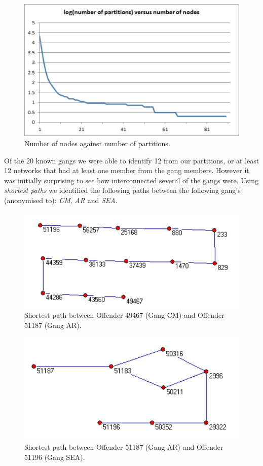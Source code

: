 \documentclass[conference]{IEEEtran}
\theoremstyle{definition}
\begin{document}
\begin{figure}[!ht] 
\centering
\includegraphics[width=\columnwidth]{images/partitions}
\caption{Number of nodes against number of partitions.}
\label{fig:partitions}
\end{figure}

Of the 20 known gangs we were able to identify 12 from our partitions,
or at least 12 networks that had at least one member from the gang
members. However it was initially surprising to see how interconnected
several of the gangs were. Using \emph{shortest paths} we identified
the following paths between the following gang's (anonymised to):
\emph{CM}, \emph{AR} and \emph{SEA}.


\begin{figure}[!ht] 
\centering
\includegraphics[width=\columnwidth]{images/path1}
\caption{Shortest path between Offender 49467 (Gang CM) and Offender 51187 (Gang AR).}
\label{fig:path1}
\end{figure}


\begin{figure}[!ht] 
\centering
\includegraphics[width=\columnwidth]{images/path2}
\caption{Shortest path between Offender 51187 (Gang AR) and Offender 51196 (Gang SEA).}
\label{fig:path2}
\end{figure}
\end{document}
